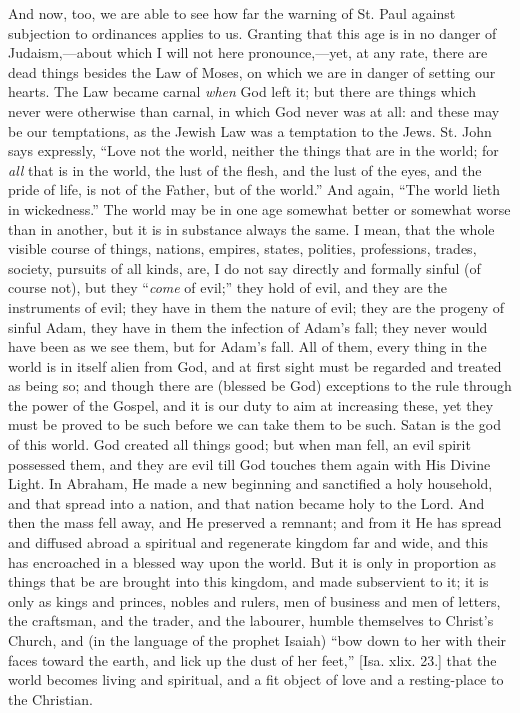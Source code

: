And now, too, we are able to see how far the warning of St. Paul
against subjection to ordinances applies to us. Granting that this age
is in no danger of Judaism,—about which I will not here pronounce,—yet,
at any rate, there are dead things besides the Law of Moses, on which
we are in danger of setting our hearts. The Law became carnal \emph{when}
God left it; but there are things which never were otherwise than
carnal, in which God never was at all: and these may be our
temptations, as the Jewish Law was a temptation to the Jews. St. John
says expressly, ``Love not the world, neither the things that are
in the world; for \emph{all} that is in the world, the lust of the
flesh, and the lust of the eyes, and the pride of life, is not of the
Father, but of the world.'' And again, ``The world lieth in
wickedness.'' The world may be in one age somewhat better or
somewhat worse than in another, but it is in substance always the
same. I mean, that the whole visible course of things, nations,
empires, states, polities, professions, trades, society, pursuits of
all kinds, are, I do not say directly and formally sinful (of course
not), but they ``\emph{come} of evil;'' they hold of evil, and
they are the instruments of evil; they have in them the nature of
evil; they are the progeny of sinful Adam, they have in them the
infection of Adam's fall; they never would have been as we see them,
but for Adam's fall. All of them, every thing in the world is in
itself alien from God, and at first sight must be regarded and treated
as being so; and though there are (blessed be God) exceptions to the
rule through the power of the Gospel, and it is our duty to aim at
increasing these, yet they must be proved to be such before we can
take them to be such. Satan is the god of this world. God created all
things good; but when man fell, an evil spirit possessed them, and
they are evil till God touches them again with His Divine Light. In
Abraham, He made a new beginning and sanctified a holy household, and
that spread into a nation, and that nation became holy to the Lord.
And then the mass fell away, and He preserved a remnant; and from it
He has spread and diffused abroad a spiritual and regenerate kingdom
far and wide, and this has encroached in a blessed way upon the world.
But it is only in proportion as things that be are brought into this
kingdom, and made subservient to it; it is only as kings and princes,
nobles and rulers, men of business and men of letters, the craftsman,
and the trader, and the labourer, humble themselves to Christ's
Church, and (in the language of the prophet Isaiah) ``bow down to
her with their faces toward the earth, and lick up the dust of her
feet,'' [Isa. xlix. 23.] that the world becomes living and
spiritual, and a fit object of love and a resting-place to the
Christian.


